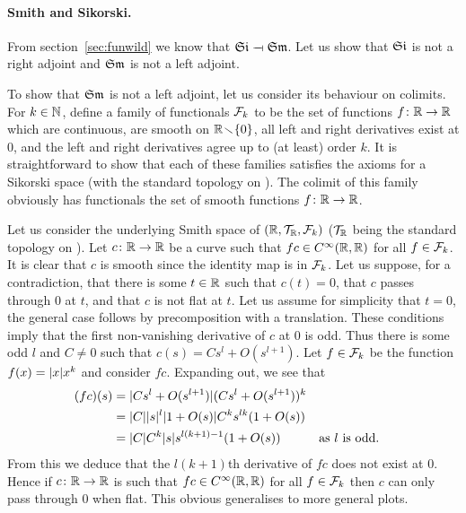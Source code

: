 \documentclass[%
12pt,%
arxiv,%
defaults
]{myclass}
\begin{document}
\paragraph{Smith and Sikorski.}

From section~\ref{sec:funwild} we know that \(\SmSi \adjoint \SiSm\).
Let us show that \(\SmSi\) is not a right adjoint and \(\SiSm\) is not a left adjoint.

To show that \(\SiSm\) is not a left adjoint, let us consider its behaviour on colimits.
For \(k \in \mathbb{N}\), define a family of functionals \(\mathcal{F}_k\) to be the set of functions \(f \colon \mathbb{R} \to \mathbb{R}\) which are continuous, are smooth on \(\mathbb{R} \!\smallsetminus\! \{0\}\), all left and right derivatives exist at \(0\), and the left and right derivatives agree up to (at least) order \(k\).
It is straightforward to show that each of these families satisfies the axioms for a Sikorski space (with the standard topology on \R).
The colimit of this family obviously has functionals the set of smooth functions \(f \colon \mathbb{R} \to \mathbb{R}\).

Let us consider the underlying Smith space of
 \((\mathbb{R}, \mathcal{T}_{\mathbb{R}}, \mathcal{F}_k)\)
(\(\mathcal{T}_{\mathbb{R}}\) being the standard topology on \R).
Let \(c \colon \mathbb{R} \to \mathbb{R}\) be a curve such that \(f c \in C^\infty(\mathbb{R},\mathbb{R})\) for all \(f \in \mathcal{F}_k\).
It is clear that \(c\) is smooth since the identity map is in \(\mathcal{F}_k\).
Let us suppose, for a contradiction, that there is some \(t \in \mathbb{R}\) such that \(c(t) = 0\), that \(c\) passes through \(0\) at \(t\), and that \(c\) is not flat at \(t\).
Let us assume for simplicity that \(t = 0\), the general case follows by precomposition with a translation.
These conditions imply that the first non\hyp{}vanishing derivative of \(c\) at \(0\) is odd.
Thus there is some odd \(l\) and \(C \ne 0\) such that
 \(c(s) = C s^l + O(s^{l+1})\).
Let \(f \in \mathcal{F}_k\) be the function \(f(x) = \lvert x \rvert x^k\) and consider \(f c\).
Expanding out, we see that
%
\begin{align*}
 (f c)(s) &%
 = \sabs{C s^l + O(s^{l+1})}(C s^l + O(s^{l+1}))^k \\
 &%
 = \sabs{C} \sabs{s}^l \sabs{1 + O(s)} C^k s^{l k}(1 + O(s)) \\
 &%
 = \sabs{C} C^k \sabs{s} s^{l (k+1) - 1}(1 + O(s)) &%
 &
 \text{as \(l\) is odd}.
\end{align*}
%
From this we deduce that the \(l(k+1)\)th derivative of \(f c\) does not exist at \(0\).
Hence if \(c \colon \mathbb{R} \to \mathbb{R}\) is such that \(f c \in C^\infty(\mathbb{R},\mathbb{R})\) for all \(f \in \mathcal{F}_k\) then \(c\) can only pass through \(0\) when flat.
This obvious generalises to more general plots.
\end{document}
